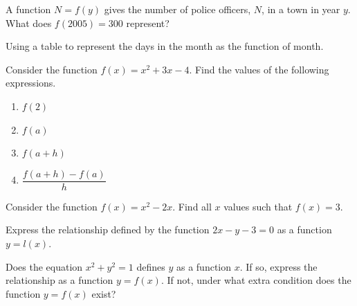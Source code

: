 \newpage


\begin{example}
  A function \(N=f(y)\) gives the number of police officers, \(N\), in a town in year \(y\). What does \(f(2005)=300\) represent?
\end{example}


\begin{example}
  Using a table to represent the days in the month as the function of month.
\end{example}

\begin{example}
  Consider the function $f(x)=x^2+3x-4$. Find the values of the following expressions.

\begin{enumerate}[fourcol]
  \item \(f(2)\)
  \item \(f(a)\)
  \item \(f(a+h)\)
  \item \(\dfrac{f(a+h)-f(a)}{h}\)
\end{enumerate}
\end{example}

\begin{example}
  Consider the function $f(x)=x^2-2x$. Find all $x$ values such that $f(x)=3$.
\end{example}

\newpage

\begin{example}
  Express the relationship defined by the function $2x-y-3=0$ as a function $y=l(x)$.
\end{example}


\begin{example}
  Does the equation \(x^2+y^2=1\) defines $y$ as a function $x$. If so, express the relationship as a function \(y=f(x)\). If not, under what extra condition does the function $y=f(x)$ exist? 
\end{example}


